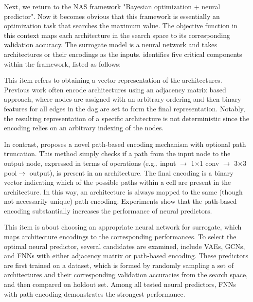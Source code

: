 Next, we return to the NAS framework "Bayesian optimization + neural predictor". Now it becomes obvious that this framework is essentially an optimization task that searches the maximum value. The objective function in this context maps each architecture in the search space to its corresponding validation accuracy. The surrogate model is a neural network and takes architectures or their encodings as the inputs. \cite{white2019bananas} identifies five critical components within the framework, listed as follows:

\begin{description}[leftmargin=0cm, listparindent=\parindent]
	\item [Architecture Encoding] This item refers to obtaining a vector representation of the architectures. Previous work often encode architectures using an adjacency matrix based approach, where nodes are assigned with an arbitrary ordering  and then binary features for all edges in the \gls{dag} are set to form the final representation.	Notably, the resulting representation of a specific architecture is not deterministic since the encoding  relies on an arbitrary indexing of the nodes. 
 
	In contrast, \cite{white2019bananas} proposes a novel path-based encoding mechanism with optional path truncation. This method simply checks if a path from the input node to the output node, expressed in terms of operations (e.g., input $\rightarrow$ 1$\times$1 conv $\rightarrow$ 3$\times$3 pool$\rightarrow$ output), is present in an architecture. The final encoding is a binary vector indicating which of the possible paths within a cell are present in the architecture. In this way, an architecture is always mapped to the same (though not necessarily unique) path encoding. Experiments show that the path-based encoding substantially increases the performance of neural predictors.
	
	\item [Neural Predictor] This item is about choosing an appropriate neural network for surrogate, which maps architecture encodings to the corresponding performances. To select the optimal neural predictor, several candidates are examined, include VAEs, GCNs, and FNNs with either adjacency matrix or path-based encoding. These predictors are first trained on a dataset, which is formed by randomly sampling a set of architectures and their corresponding validation accuracies from the search space, and then compared on holdout set. Among all tested neural predictors, FNNs with path encoding demonstrates the strongest performance.
	 

\end{description}
